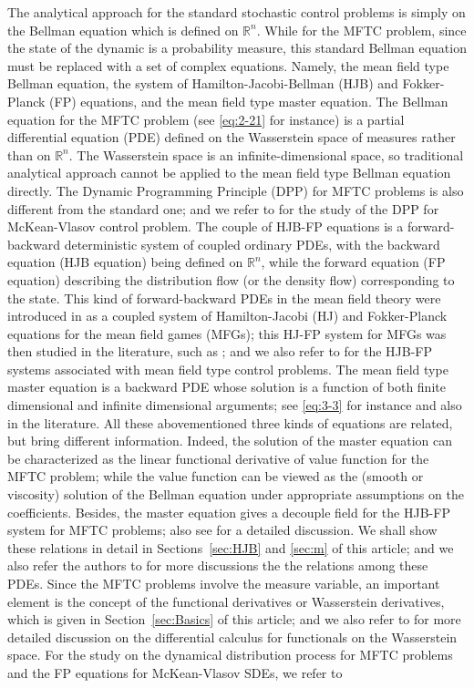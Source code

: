 \documentclass[11pt]{article}
\numberwithin{equation}{section}
\newcommand{\brn}{{\mathbb{R}^n}}
\newcommand{\1}{\mbox{1\hspace{-1mm}I}}
\begin{document}
The analytical approach for the standard stochastic control problems is simply on the Bellman equation which is defined on $\brn$. While for the MFTC problem, since the state of the dynamic is a probability measure, this standard Bellman equation must be replaced with a set of complex equations. Namely, the mean field type Bellman equation, the system of Hamilton-Jacobi-Bellman (HJB) and Fokker-Planck (FP) equations, and the mean field type master equation. The Bellman equation for the MFTC problem (see \eqref{eq:2-21} for instance) is a partial differential equation (PDE) defined on the Wasserstein space of measures rather than on $\brn$. The Wasserstein space is an infinite-dimensional space, so traditional analytical approach cannot be applied to the mean field type Bellman equation directly. The Dynamic Programming Principle (DPP) for MFTC problems is also different from the standard one; and we refer to \cite{DMF,PH} for the study of the DPP for McKean-Vlasov control problem. The couple of HJB-FP equations is a forward-backward deterministic system of coupled ordinary PDEs, with the backward equation (HJB equation) being defined on $\brn$, while the forward equation (FP equation) describing the distribution flow (or the density flow) corresponding to the state. This kind of forward-backward PDEs in the mean field theory were introduced in \cite{JM3} as a coupled system of Hamilton-Jacobi (HJ) and Fokker-Planck equations for the mean field games (MFGs); this HJ-FP system for MFGs was then studied in the literature, such as \cite{GDA}; and we also refer to \cite{AB_book,AB_JMPA} for the HJB-FP systems associated with mean field type control problems. The mean field type master equation is a backward PDE whose solution is a function of both finite dimensional and infinite dimensional arguments; see \eqref{eq:3-3} for instance and also \cite{AB_JMPA,AB_SPA,MR3332710} in the literature. All these abovementioned three kinds of equations are related, but bring different information. Indeed, the solution of the master equation can be characterized as the linear functional derivative of value function for the MFTC problem; while the value function can be viewed as the (smooth or viscosity) solution of the Bellman equation under appropriate assumptions on the coefficients. Besides, the master equation gives a decouple field for the HJB-FP system for MFTC problems; also see \cite{AB_JMPA} for a detailed discussion. We shall show these relations in detail in Sections~\ref{sec:HJB} and \ref{sec:m} of this article; and we also refer the authors to \cite{AB_JMPA,CDLL} for more discussions the the relations among these PDEs. Since the MFTC problems involve the measure variable, an important element is the concept of the functional derivatives or Wasserstein derivatives, which is given in Section~\ref{sec:Basics} of this article; and we also refer to \cite{book_mfg} for more detailed discussion on the differential calculus for functionals on the Wasserstein space. For the study on the dynamical distribution process for MFTC problems and the FP equations for McKean-Vlasov SDEs, we refer to 
\end{document}
